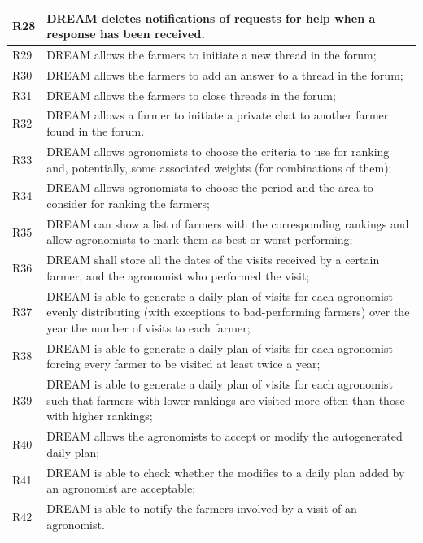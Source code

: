 \documentclass{article}
\begin{document}
\begin{longtable}[c]{|m{0.75cm}|m{11cm}|}
  \hline
R28\label{R} & DREAM deletes notifications of requests for help when a response has been received.\\
  \hline
R29\label{R} & DREAM allows the farmers to initiate a new thread in the forum;\\
  \hline
R30\label{R} & DREAM allows the farmers to add an answer to a thread in the forum;\\
  \hline
R31\label{R} & DREAM allows the farmers to close threads in the forum;\\
  \hline
R32\label{R} & DREAM allows a farmer to initiate a private chat to another farmer found in the forum.\\
  \hline
R33\label{R} & DREAM allows agronomists to choose the criteria to use for ranking and, potentially, some associated weights (for combinations of them);\\
  \hline
R34\label{R} & DREAM allows agronomists to choose the period and the area to consider for ranking the farmers;\\
  \hline
R35\label{R} & DREAM can show a list of farmers with the corresponding rankings and allow agronomists to mark them as best or worst-performing;\\
  \hline
R36\label{R} & DREAM shall store all the dates of the visits received by a certain farmer, and the agronomist who performed the visit;\\
  \hline
R37\label{R} & DREAM is able to generate a daily plan of visits for each agronomist evenly distributing (with exceptions to bad-performing farmers) over the year the number of visits to each farmer;\\
  \hline
R38\label{R} & DREAM is able to generate a daily plan of visits for each agronomist forcing every farmer to be visited at least twice a year;\\
  \hline
R39\label{R} & DREAM is able to generate a daily plan of visits for each agronomist such that farmers with lower rankings are visited more often than those with higher rankings;\\
  \hline
R40\label{R} & DREAM allows the agronomists to accept or modify the autogenerated daily plan;\\
  \hline
R41\label{R} & DREAM is able to check whether the modifies to a daily plan added by an agronomist are acceptable;\\
  \hline
R42\label{R} & DREAM is able to notify the farmers involved by a visit of an agronomist.\\
  \hline
  \end{longtable}
  \newpage
\end{document}
